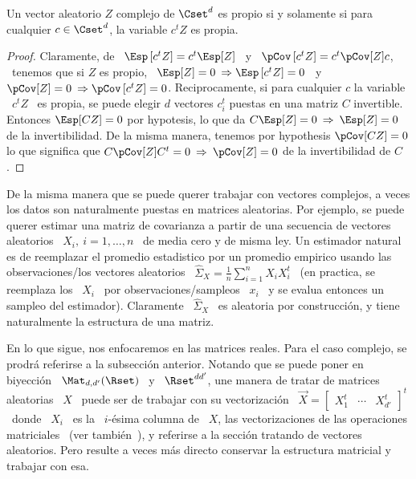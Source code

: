 \begin{teorema}\label{Teo:MP:PropioProy}
%
  Un vector  aleatorio $Z$ complejo de  $\Cset^d$ es propio si  y solamente si para
  cualquier $c \in \Cset^d$, la variable $c^t Z$ es propia.
\end{teorema}
\begin{proof}
  Claramente, de \  $\Esp\left[ c^t Z \right] = c^t \Esp[Z]$  \ y \ $\pCov\left[
    c^t Z \right] = c^t \pCov[Z] c$,  \ tenemos que si $Z$ es propio, \ $\Esp[Z]
  = 0  \: \Rightarrow  \Esp\left[ c^t  Z \right]  = 0$ \  y \  $\pCov[Z] =  0 \:
  \Rightarrow \pCov\left[  c^tZ \right] =  0$. \newline Reciprocamente,  si para
  cualquier $c$ la variable \ $c^t Z$  \ es propia, se puede elegir $d$ vectores
  $c_i^t$ puestas  en una matriz  $C$ invertible. Entonces  $\Esp[C Z] =  0$ por
  hypotesis, lo  que da  $C \Esp[Z] =  0 \:  \Rightarrow \: \Esp[Z]  = 0$  de la
  invertibilidad. De la misma manera, tenemos por hypothesis $\pCov[C Z] = 0$ lo
  que significa que  $C \pCov[Z] C^t = 0  \: \Rightarrow \: \pCov[Z] =  0$ de la
  invertibilidad de $C$.
\end{proof}



\label{Ssec:MP:MA}

De la misma manera que se  puede querer trabajar con vectores complejos, a veces
los datos son naturalmente puestas en matrices aleatorias. Por ejemplo, se puede
querer estimar  una matriz de covarianza  a partir de una  secuencia de vectores
aleatorios \  $X_i, \: i =  1, \ldots ,  n$ \ de media  cero y de misma  ley. Un
estimador  natural es  de reemplazar  el  promedio estadistico  por un  promedio
empirico usando las  observaciones/los vectores aleatorios \ $\widehat{\Sigma}_X
= \frac1n \sum_{i=1}^n X_i X_i^t$ \ (en practica, se reemplaza los \ $X_i$ \ por
observaciones/sampleos  \  $x_i$   \  y  se  evalua  entonces   un  sampleo  del
estimador). Claramente \ $\widehat{\Sigma}_X$ \ es aleatoria por construcci\'on,
y tiene naturalmente la estructura de una matriz.

En lo que sigue, nos enfocaremos  en las matrices reales. Para el caso complejo,
se prodr\'a referirse a la subsecci\'on  anterior. Notando que se puede poner en
biyecci\'on \ $\Mat_{d,d'}(\Rset)$  \ y \ $\Rset^{d d'}$, une  manera de tratar de
matrices  aleatorias \  $X$ \  puede ser  de trabajar  con su  vectorizaci\'on \
$\vec{X} = \begin{bmatrix} X_1^t &  \cdots & X_{d'}^t \end{bmatrix}^t$ \ donde \
$X_i$  \ es  la  \ $i$-\'esima  columna de  \  $X$, las  vectorizaciones de  las
operaciones  matriciales~\cite[Cap.~2]{MagNeu79}  (ver tambi\'en~\cite{NeuWan83,
  Har08}), y  referirse a  la secci\'on tratando  de vectores  aleatorios.  Pero
resulte a veces  m\'as directo conservar la estructura  matricial y trabajar con
esa.

